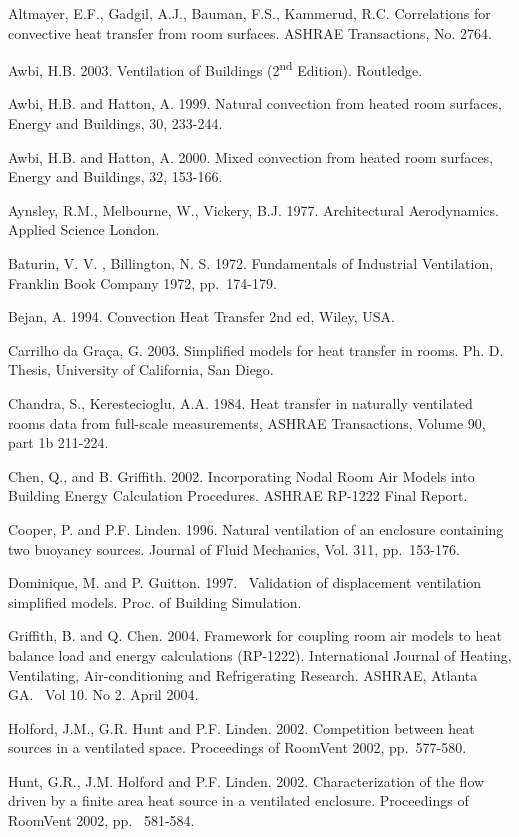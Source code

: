 Altmayer, E.F., Gadgil, A.J., Bauman, F.S., Kammerud, R.C. Correlations for convective heat transfer from room surfaces. ASHRAE Transactions, No. 2764.

Awbi, H.B. 2003. Ventilation of Buildings (2\textsuperscript{nd} Edition). Routledge.

Awbi, H.B. and Hatton, A. 1999. Natural convection from heated room surfaces, Energy and Buildings, 30, 233-244.

Awbi, H.B. and Hatton, A. 2000. Mixed convection from heated room surfaces, Energy and Buildings, 32, 153-166.

Aynsley, R.M., Melbourne, W., Vickery, B.J. 1977. Architectural Aerodynamics. Applied Science London.

Baturin, V. V. , Billington, N. S. 1972. Fundamentals of Industrial Ventilation, Franklin Book Company 1972, pp.~174-179.

Bejan, A. 1994. Convection Heat Transfer 2nd ed, Wiley, USA.

Carrilho da Gra\c{c}a, G. 2003. Simplified models for heat transfer in rooms. Ph. D. Thesis, University of California, San Diego.

Chandra, S., Kerestecioglu, A.A. 1984. Heat transfer in naturally ventilated rooms data from full-scale measurements, ASHRAE Transactions, Volume 90, part 1b 211-224.

Chen, Q., and B. Griffith. 2002. Incorporating Nodal Room Air Models into Building Energy Calculation Procedures. ASHRAE RP-1222 Final Report.

Cooper, P. and P.F. Linden. 1996. Natural ventilation of an enclosure containing two buoyancy sources. Journal of Fluid Mechanics, Vol. 311, pp.~153-176.

Dominique, M. and P. Guitton. 1997.~ Validation of displacement ventilation simplified models. Proc. of Building Simulation.

Griffith, B. and Q. Chen. 2004. Framework for coupling room air models to heat balance load and energy calculations (RP-1222). International Journal of Heating, Ventilating, Air-conditioning and Refrigerating Research. ASHRAE, Atlanta GA.~ Vol 10. No 2. April 2004.

Holford, J.M., G.R. Hunt and P.F. Linden. 2002. Competition between heat sources in a ventilated space. Proceedings of RoomVent 2002, pp.~577-580.

Hunt, G.R., J.M. Holford and P.F. Linden. 2002. Characterization of the flow driven by a finite area heat source in a ventilated enclosure. Proceedings of RoomVent 2002, pp.~ 581-584.

